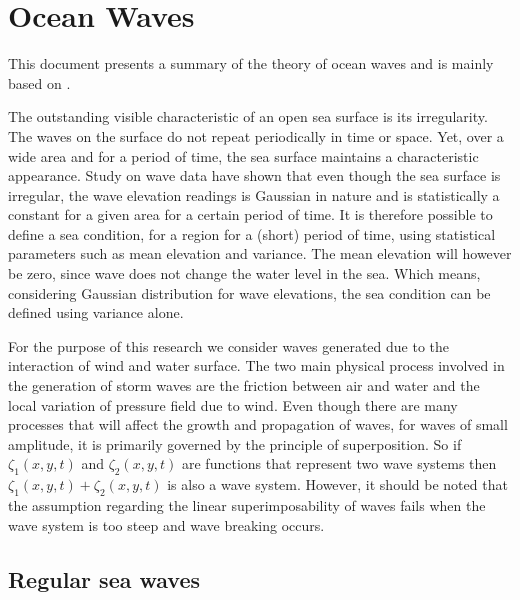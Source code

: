 \section{Ocean Waves} \label{Ocean Waves} 
This document presents a summary of the theory of ocean waves and is mainly 
based on \cite{lewis1988principles}.

The outstanding visible characteristic of an open sea surface is its
irregularity. The waves on the surface do not repeat periodically in time or
space. Yet, over a wide area and for a period of time, the sea surface maintains
a characteristic appearance. Study on wave data have shown that even though the
sea surface is irregular, the wave elevation readings is Gaussian in nature and
is statistically a constant for a given area for a certain period of time. It is
therefore possible to define a sea condition, for a region for a (short) period
of time, using statistical parameters such as mean elevation and variance. The
mean elevation will however be zero, since wave does not change the water level
in the sea. Which means, considering Gaussian distribution for wave elevations,
the sea condition can be defined using variance alone.

For the purpose of this research we consider waves generated due to the
interaction of wind and water surface. The two main physical process involved in
the generation of storm waves are the friction between air and water and the
local variation of pressure field due to wind. Even though there are many
processes that will affect the growth and propagation of waves, for waves of
small amplitude, it is primarily governed by the principle of superposition. So
if $\zeta_1(x,y,t)$ and $\zeta_2(x,y,t)$ are functions that represent two wave
systems then $\zeta_1(x,y,t) + \zeta_2(x,y,t)$ is also a wave system.  However,
it should be noted that the assumption regarding the linear superimposability of
waves fails when the wave system is too steep and wave breaking occurs.

\subsection{Regular sea waves} \label{Regular sea waves}


